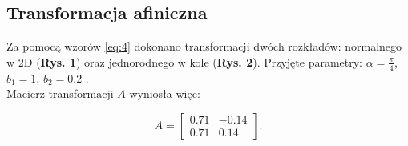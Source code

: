 \documentclass[a4paper,12pt,twoside]{article}
\begin{document}
\subsection{Transformacja afiniczna}

Za pomocą wzorów \ref{eq:4} dokonano transformacji dwóch rozkładów: normalnego w 2D (\textbf{Rys. 1}) oraz jednorodnego w kole (\textbf{Rys. 2}). Przyjęte parametry: $\alpha = \frac{\pi}{4}$, $b_1 = 1$, $b_2 = 0.2$ . \\

Macierz transformacji $A$ wyniosła więc:

\begin{equation*}
A = 
    \begin{bmatrix}
            0.71 & -0.14 \\
            0.71 & 0.14
    \end{bmatrix}.
\end{equation*}
\end{document}
